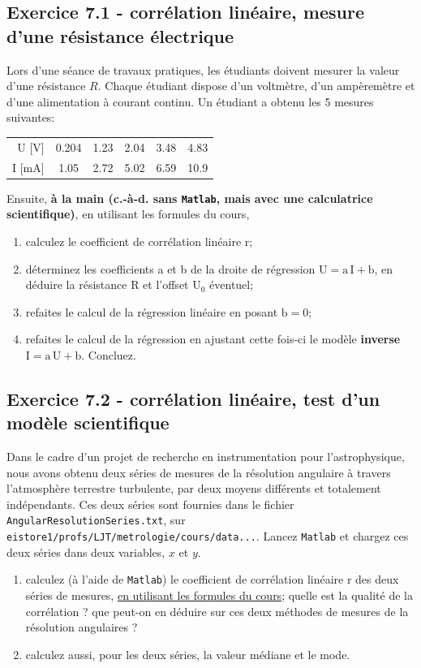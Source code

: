 \documentclass[main.tex]{subfiles}
\begin{document}
\subsection*{Exercice 7.1 - corrélation linéaire, mesure d'une résistance électrique}

Lors d'une séance de travaux pratiques, les étudiants doivent mesurer la valeur d'une résistance $R$. Chaque étudiant dispose d'un voltmètre, d'un ampèremètre et d'une alimentation à courant continu. Un étudiant a obtenu les 5 mesures suivantes:
\begin{center}
    \begin{tabular}{r|ccccc}
        U [V]  & 0.204 & 1.23 & 2.04 & 3.48 & 4.83 \\
        I [mA] & 1.05  & 2.72 & 5.02 & 6.59 & 10.9
    \end{tabular}
\end{center}

Ensuite, \textbf{à la main (c.-à-d. sans \texttt{Matlab}, mais avec une calculatrice scientifique)}, en utilisant les formules du cours,
\begin{enumerate}
    \item calculez le coefficient de corrélation linéaire r;
    \item déterminez les coefficients a et b de la droite de régression $\text{U}=\text{a}\,\text{I}+\text{b}$, en déduire la résistance R et l'offset $\text{U}_0$ éventuel;
    \item refaites le calcul de la régression linéaire en posant $\text{b}=0$;
    \item refaites le calcul de la régression en ajustant cette fois-ci le modèle \textbf{inverse} $\text{I}=\text{a}\,\text{U}+\text{b}$. Concluez.
\end{enumerate}

\subsection*{Exercice 7.2 - corrélation linéaire, test d'un modèle scientifique}

Dans le cadre d'un projet de recherche en instrumentation pour l'astrophysique, nous avons obtenu deux séries de mesures de la résolution angulaire à travers l'atmosphère terrestre turbulente, par deux moyens différents et totalement indépendants. Ces deux séries sont fournies dans le fichier \texttt{AngularResolutionSeries.txt}, sur \newline
\texttt{eistore1/profs/LJT/metrologie/cours/data...}. Lancez \texttt{Matlab} et chargez ces deux séries dans deux variables, $x$ et $y$.
\begin{enumerate}
    \item calculez (à l'aide de \texttt{Matlab}) le coefficient de corrélation linéaire r des deux séries de mesures, \underline{en utilisant les formules du cours}; quelle est la qualité de la corrélation ? que peut-on en déduire sur ces deux méthodes de mesures de la résolution angulaires ?
    \item calculez aussi, pour les deux séries, la valeur médiane et le mode.
\end{enumerate}
\end{document}
